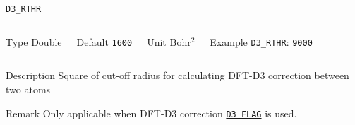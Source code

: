 \documentclass[xcolor=dvipsnames,t]{beamer}
\begin{document}
\begin{frame}[allowframebreaks]{\texttt{D3\_RTHR}} \label{D3_RTHR}
\vspace*{-12pt}
\begin{columns}
\begin{block}{Type}
Double
\end{block}

\begin{block}{Default}
\texttt{1600}
\end{block}

\begin{block}{Unit}
Bohr$^2$
\end{block}

\begin{block}{Example}
\texttt{D3\_RTHR}: \texttt{9000}
\end{block}
\end{columns}

\begin{block}{Description}
Square of cut-off radius for calculating DFT-D3 correction between two atoms
\end{block}

\begin{block}{Remark}
Only applicable when DFT-D3 correction \hyperlink{D3_FLAG}{\texttt{D3\_FLAG}} is used.
\end{block}

\end{frame}
\end{document}
